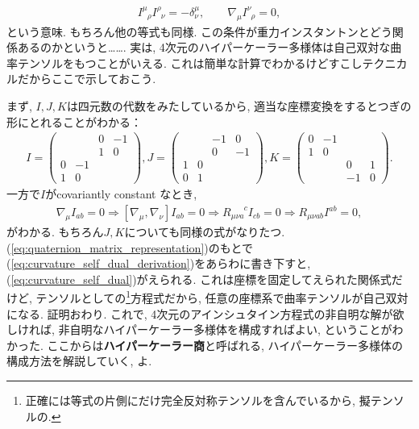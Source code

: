 \documentclass{ltjsarticle}
\theoremstyle{definition}
\begin{document}
\begin{gather}
  I^\mu_{\phantom{\mu}\rho}I^\rho_{\phantom{\rho}\nu}=-\delta^\mu_\nu,\qquad\nabla_\mu I^\nu_{\phantom{\nu}\rho}=0,
\end{gather}
という意味. もちろん他の等式も同様. この条件が重力インスタントンとどう関係あるのかというと……. 実は, 4次元のハイパーケーラー多様体は自己双対な曲率テンソルをもつことがいえる. これは簡単な計算でわかるけどすこしテクニカルだからここで示しておこう.\par
まず, $I,J,K$は四元数の代数をみたしているから, 適当な座標変換をするとつぎの形にとれることがわかる：
\begin{align}
  I=
  \begin{pmatrix}
    &&0&-1\\
    &&1&0\\
    0&-1&&\\
    1&0&&
  \end{pmatrix},
  J=
  \begin{pmatrix}
    &&-1&0\\
    &&0&-1\\
    1&0&&\\
    0&1&&
  \end{pmatrix},
  K=
  \begin{pmatrix}
    0&-1&&\\
    1&0&&\\
    &&0&1\\
    &&-1&0
  \end{pmatrix}.\label{eq:quaternion_matrix_representation}
\end{align}
一方で$I$がcovariantly constant なとき,
\begin{align}
  \nabla_\mu I_{ab}=0\Rightarrow\left[\nabla_\mu,\nabla_\nu\right]I_{ab}=0\Rightarrow R_{\mu\nu a}^{\phantom{\mu\nu a}c}I_{cb}=0\Rightarrow R_{\mu\nu ab}I^{ab}=0,\label{eq:curvature_self_dual_derivation}
\end{align}
がわかる. もちろん$J,K$についても同様の式がなりたつ. (\ref{eq:quaternion_matrix_representation})のもとで(\ref{eq:curvature_self_dual_derivation})をあらわに書き下すと, (\ref{eq:curvature_self_dual})がえられる. これは座標を固定してえられた関係式だけど, テンソルとしての\footnote{正確には等式の片側にだけ完全反対称テンソルを含んでいるから, 擬テンソルの.}方程式だから, 任意の座標系で曲率テンソルが自己双対になる. 証明おわり. これで, 4次元のアインシュタイン方程式の非自明な解が欲しければ, 非自明なハイパーケーラー多様体を構成すればよい, ということがわかった. ここからは\textbf{ハイパーケーラー商}と呼ばれる, ハイパーケーラー多様体の構成方法を解説していく, よ.\par
\end{document}
